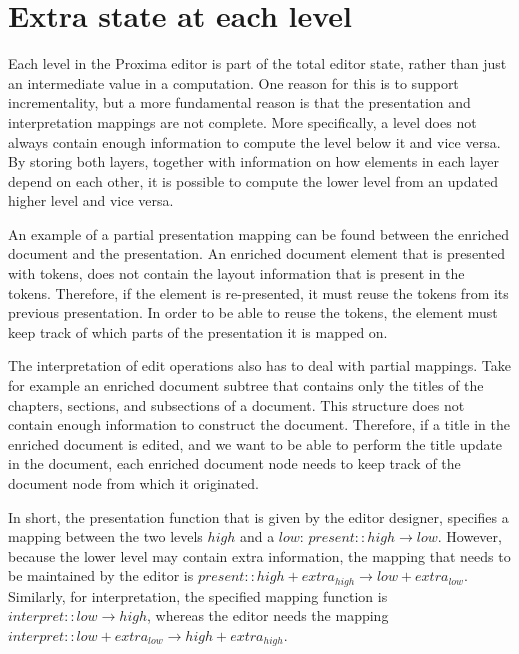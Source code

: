 %																
%																
%																
\section{Extra state at each level} \label{sect:archExtraState}

Each level in the Proxima editor is part of the total editor state, rather than just an intermediate value in a computation. One reason for this is to support incrementality, but a more fundamental reason is that the presentation and interpretation mappings are not complete. More specifically, a level does not always contain enough information to compute the level below it and vice versa. By storing both layers, together with information on how elements in each layer depend on each other, it is possible to compute the lower level from an updated higher level and vice versa.

An example of a partial presentation mapping can be found between the enriched document and the presentation. An enriched document element that is presented with tokens, does not contain the layout information that is present in the tokens. Therefore, if the element is re-presented, it must reuse the tokens from its previous presentation. In order to be able to reuse the tokens, the element must keep track of which parts of the presentation it is mapped on.

The interpretation of edit operations also has to deal with partial mappings. Take for example an enriched document subtree that contains only the titles of the chapters, sections, and subsections of a document. This structure does not contain enough information to construct the document. Therefore, if a title in the enriched document is edited, and we want to be able to perform the title update in the document, each enriched document node needs to keep track of the document node from which it originated. 

In short, the presentation function that is given by the editor designer, specifies a mapping between the two levels $high$ and a $low$:  $present :: high \rightarrow low$. However, because the lower level may contain extra information, the mapping that needs to be maintained by the editor is 
$present :: high+extra_{high} \rightarrow low+extra_{low}$. Similarly, for interpretation, the specified mapping function is 
$interpret :: low \rightarrow high$, whereas the editor needs the mapping 
$interpret :: low+extra_{low} \rightarrow high+extra_{high}$. 

